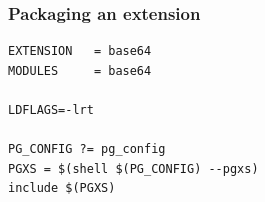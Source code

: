 \documentclass{beamer}
\begin{document}
\begin{frame}[fragile]
  \frametitle{Packaging an extension}

  \vfill

\begin{verbatim}
EXTENSION   = base64
MODULES     = base64

LDFLAGS=-lrt

PG_CONFIG ?= pg_config
PGXS = $(shell $(PG_CONFIG) --pgxs)
include $(PGXS)
\end{verbatim}
\end{frame}

\end{document}
